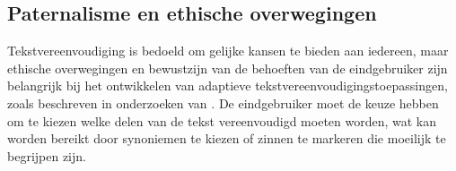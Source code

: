 

\subsection{Paternalisme en ethische overwegingen}

Tekstvereenvoudiging is bedoeld om gelijke kansen te bieden aan iedereen, maar ethische overwegingen en bewustzijn van de behoeften van de eindgebruiker zijn belangrijk bij het ontwikkelen van adaptieve tekstvereenvoudigingstoepassingen, zoals beschreven in onderzoeken van \textcite{Niemeijer2010, Xu2015, Gooding2022}. De eindgebruiker moet de keuze hebben om te kiezen welke delen van de tekst vereenvoudigd moeten worden, wat kan worden bereikt door synoniemen te kiezen of zinnen te markeren die moeilijk te begrijpen zijn.

